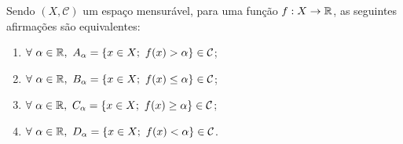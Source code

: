 \begin{theorem}
\label{teo:equiv-funcoes-mensuraveis}
    Sendo $(X,\mathcal{C})$ um espaço mensurável, para uma função $f: X \to \mathbb{R}$, as seguintes afirmações são equivalentes:
    \begin{multicols}{2}
        
    \begin{enumerate}[label=(\alph*)]
        \item $\forall \ \alpha \in \mathbb{R}, \ A_\alpha =\{x \in X;\ f(x) > \alpha \} \in \mathcal{C}$;
        \item $\forall \ \alpha \in \mathbb{R}, \ B_\alpha =\{x \in X;\ f(x) \leq \alpha \} \in \mathcal{C}$;
        \item $\forall \ \alpha \in \mathbb{R}, \ C_\alpha =\{x \in X;\ f(x) \geq \alpha \} \in \mathcal{C}$;
        \item $\forall \ \alpha \in \mathbb{R}, \ D_\alpha =\{x \in X;\ f(x) < \alpha \} \in \mathcal{C}$.
    \end{enumerate}
     \end{multicols}

\end{theorem}

